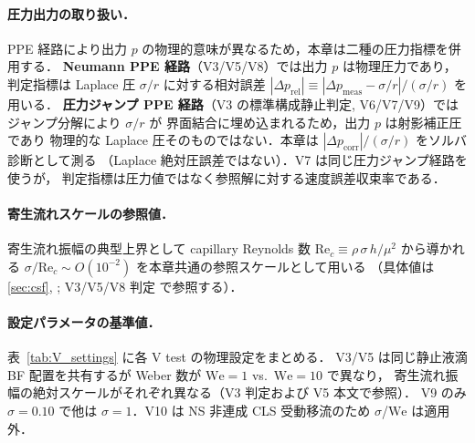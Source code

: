 \paragraph{圧力出力の取り扱い．}
PPE 経路により出力 $p$ の物理的意味が異なるため，本章は二種の圧力指標を併用する．
\textbf{Neumann PPE 経路}（V3/V5/V8）では出力 $p$ は物理圧力であり，
判定指標は Laplace 圧 $\sigma/r$ に対する相対誤差
$|\Delta p_{\mathrm{rel}}| \equiv |\Delta p_{\mathrm{meas}} - \sigma/r|/(\sigma/r)$ を用いる．
\textbf{圧力ジャンプ PPE 経路}（V3 の標準構成静止判定, V6/V7/V9）ではジャンプ分解により $\sigma/r$ が
界面結合に埋め込まれるため，出力 $p$ は射影補正圧であり
物理的な Laplace 圧そのものではない．本章は
$|\Delta p_{\mathrm{corr}}|/(\sigma/r)$ をソルバ診断として測る
（Laplace 絶対圧誤差ではない）．V7 は同じ圧力ジャンプ経路を使うが，
判定指標は圧力値ではなく参照解に対する速度誤差収束率である．

\paragraph{寄生流れスケールの参照値．}
寄生流れ振幅の典型上界として capillary Reynolds 数
$\mathrm{Re}_c \equiv \rho\,\sigma\,h/\mu^2$ から導かれる
$\sigma/\mathrm{Re}_c \sim O(10^{-2})$ を本章共通の参照スケールとして用いる
（具体値は \autoref{sec:csf}, \cite{Popinet2009,DennerVanWachem2015}; V3/V5/V8 判定
で参照する）．

\paragraph{設定パラメータの基準値．}
表~\ref{tab:V_settings} に各 V test の物理設定をまとめる．
V3/V5 は同じ静止液滴 BF 配置を共有するが Weber 数が
$\mathrm{We}=1$ vs.\ $\mathrm{We}=10$ で異なり，
寄生流れ振幅の絶対スケールがそれぞれ異なる（V3 判定および V5 本文で参照）．
V9 のみ $\sigma=0.10$ で他は $\sigma=1$．V10 は NS 非連成 CLS 受動移流のため
$\sigma$/$\mathrm{We}$ は適用外．

